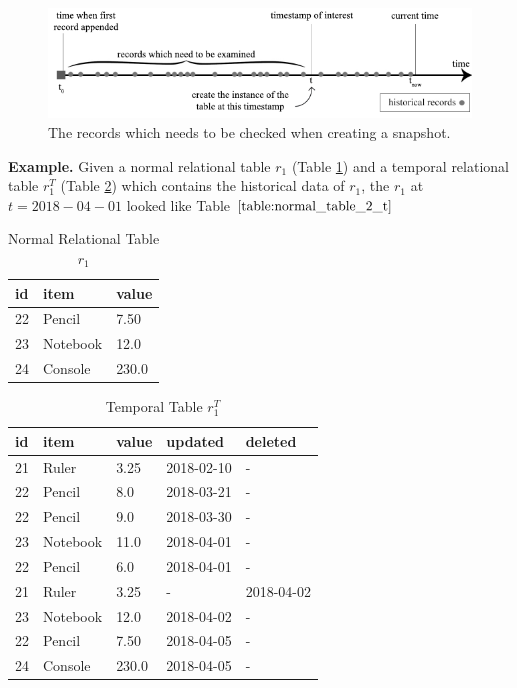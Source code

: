 \begin{figure}[b]
	\centering
	\includegraphics[width=\textwidth]{figs/tobechecked_records.pdf}
	\caption{The records which needs to be checked when creating a snapshot.}
	\label{fig:checked_records}
\end{figure}

\textbf{Example.} Given a normal relational table $r_1$ (Table \ref{table:normal_table_2}) and a temporal relational table $r_1^T$ (Table \ref{table:temporal_table_2}) which contains the historical data of $r_1$, the $r_1$ at $t=2018-04-01$ looked like Table $\ref{table:normal_table_2_t}$
\begin{center}

\begin{table}[t]
	\centering
	\caption{Normal Relational Table $r_1$}
	\label{table:normal_table_2}
	\begin{tabular}{p{4cm}p{4cm}p{4cm}}
		\hline
		id & item      & value  \\ \hline
		22 & Pencil    & 7.50 \\
		23 & Notebook & 12.0   \\ 
		24 & Console & 230.0 \\ \hline
	\end{tabular}
\end{table}

\begin{table}[t]
	\centering
	\caption{Temporal Table $r_1^T$}
	\label {table:temporal_table_2}
	\begin{tabular}{p{1cm}p{2cm}p{3cm}p{3cm}p{2cm}}
		\hline
		id & item      & value  & updated  & deleted\\ \hline
		21 & Ruler    & 3.25  & 2018-02-10  &  - \\  
		22 & Pencil    & 8.0  & 2018-03-21  &  - \\
		22 & Pencil    & 9.0  & 2018-03-30  &  -\\
		23 & Notebook & 11.0  & 2018-04-01 & - \\
		22 & Pencil & 6.0  & 2018-04-01 & - \\
		21 & Ruler    & 3.25  & -  &  2018-04-02 \\
		23 & Notebook & 12.0  & 2018-04-02 & - \\ 
		22 & Pencil & 7.50  & 2018-04-05 & - \\ 
		24 & Console & 230.0  & 2018-04-05 & - \\ \hline
	\end{tabular}
\end{table}
\end{center}
